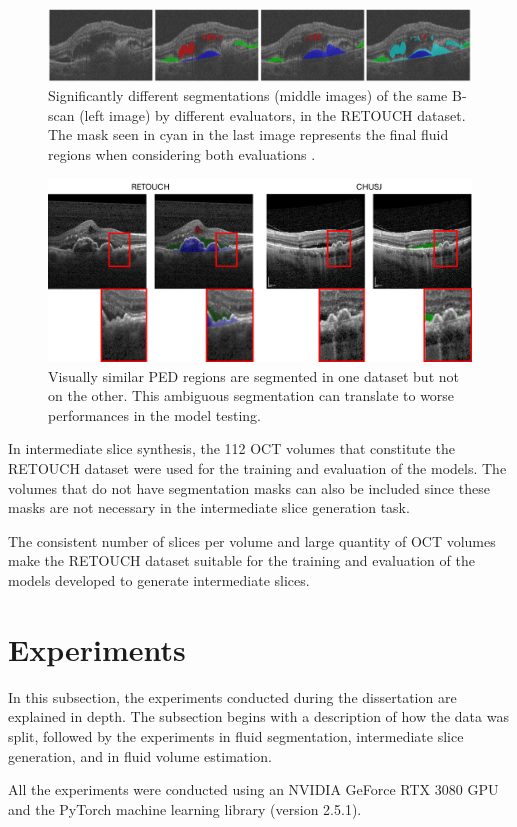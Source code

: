 \begin{figure}[!ht]
	\centering
	\includegraphics[width=1.0\linewidth]{figures/RETOUCHSegmentationDifferences.png}
	\caption{Significantly different segmentations (middle images) of the same B-scan (left image) by different evaluators, in the RETOUCH dataset. The mask seen in cyan in the last image represents the final fluid regions when considering both evaluations \parencite{Bogunovic2019b}.}
	\label{fig:RETOUCHSegmentationDifferences}
\end{figure}

\begin{figure}[!ht]
	\centering
	\includegraphics[width=1.0\linewidth]{figures/RETOUCHvsCHUSJSegmentationCriteria.png}
	\caption{Visually similar PED regions are segmented in one dataset but not on the other. This ambiguous segmentation can translate to worse performances in the model testing.}
	\label{fig:RETOUCHvsCHUSJSegmentationCriteria}
\end{figure}

\par
In intermediate slice synthesis, the 112 OCT volumes that constitute the RETOUCH dataset were used for the training and evaluation of the models. The volumes that do not have segmentation masks can also be included since these masks are not necessary in the intermediate slice generation task.
\par
The consistent number of slices per volume and large quantity of OCT volumes make the RETOUCH dataset suitable for the training and evaluation of the models developed to generate intermediate slices.

\section{Experiments}\label{Experiments}
In this subsection, the experiments conducted during the dissertation are explained in depth. The subsection begins with a description of how the data was split, followed by the experiments in fluid segmentation, intermediate slice generation, and in fluid volume estimation.
\par
All the experiments were conducted using an NVIDIA GeForce RTX 3080 GPU and the \hbox{PyTorch} machine learning library (version 2.5.1).

